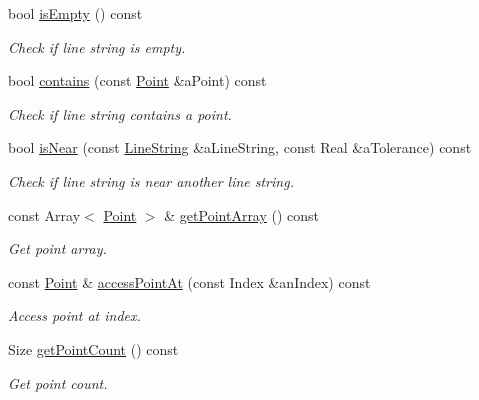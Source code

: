 \begin{DoxyCompactItemize}
bool \hyperlink{classostk_1_1math_1_1geom_1_1d2_1_1objects_1_1_line_string_a2fe1d6a0a8a917b00b13ab9c3cf24bf3}{is\+Empty} () const
\begin{DoxyCompactList}\small\item\em Check if line string is empty. \end{DoxyCompactList}\item 
bool \hyperlink{classostk_1_1math_1_1geom_1_1d2_1_1objects_1_1_line_string_a04cc661c265dc5777b08754c8015c600}{contains} (const \hyperlink{classostk_1_1math_1_1geom_1_1d2_1_1objects_1_1_point}{Point} \&a\+Point) const
\begin{DoxyCompactList}\small\item\em Check if line string contains a point. \end{DoxyCompactList}\item 
bool \hyperlink{classostk_1_1math_1_1geom_1_1d2_1_1objects_1_1_line_string_a5772e2ac0f24c76d9957e1617077b04a}{is\+Near} (const \hyperlink{classostk_1_1math_1_1geom_1_1d2_1_1objects_1_1_line_string}{Line\+String} \&a\+Line\+String, const Real \&a\+Tolerance) const
\begin{DoxyCompactList}\small\item\em Check if line string is near another line string. \end{DoxyCompactList}\item 
const Array$<$ \hyperlink{classostk_1_1math_1_1geom_1_1d2_1_1objects_1_1_point}{Point} $>$ \& \hyperlink{classostk_1_1math_1_1geom_1_1d2_1_1objects_1_1_line_string_a66969b9cadd8d7b03d3ed1dade26388b}{get\+Point\+Array} () const
\begin{DoxyCompactList}\small\item\em Get point array. \end{DoxyCompactList}\item 
const \hyperlink{classostk_1_1math_1_1geom_1_1d2_1_1objects_1_1_point}{Point} \& \hyperlink{classostk_1_1math_1_1geom_1_1d2_1_1objects_1_1_line_string_a716b6b5f34bbbdcea2a3b4e8e5faf9b5}{access\+Point\+At} (const Index \&an\+Index) const
\begin{DoxyCompactList}\small\item\em Access point at index. \end{DoxyCompactList}\item 
Size \hyperlink{classostk_1_1math_1_1geom_1_1d2_1_1objects_1_1_line_string_af4a7c10fc43a4facff65280e23217ec4}{get\+Point\+Count} () const
\begin{DoxyCompactList}\small\item\em Get point count. \end{DoxyCompactList}\item 

\end{DoxyCompactItemize}
